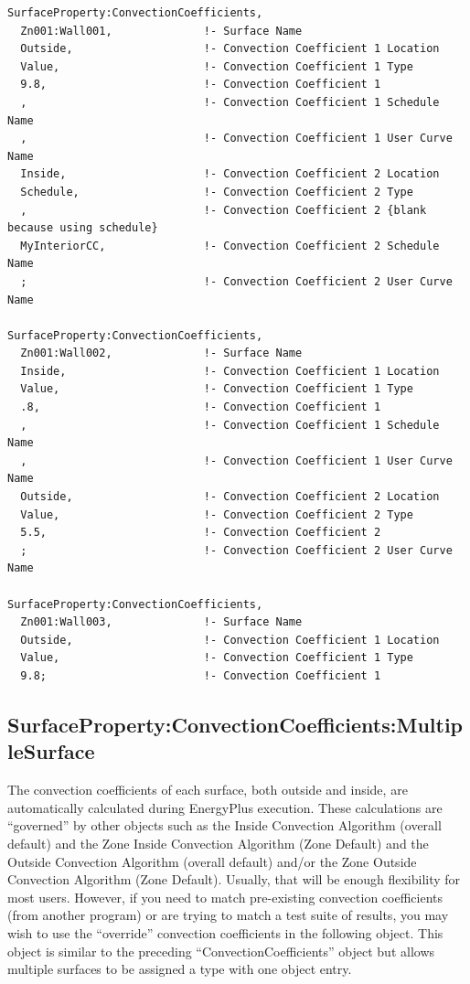 \begin{lstlisting}
SurfaceProperty:ConvectionCoefficients,
  Zn001:Wall001,              !- Surface Name
  Outside,                    !- Convection Coefficient 1 Location
  Value,                      !- Convection Coefficient 1 Type
  9.8,                        !- Convection Coefficient 1
  ,                           !- Convection Coefficient 1 Schedule Name
  ,                           !- Convection Coefficient 1 User Curve Name
  Inside,                     !- Convection Coefficient 2 Location
  Schedule,                   !- Convection Coefficient 2 Type
  ,                           !- Convection Coefficient 2 {blank because using schedule}
  MyInteriorCC,               !- Convection Coefficient 2 Schedule Name
  ;                           !- Convection Coefficient 2 User Curve Name

SurfaceProperty:ConvectionCoefficients,
  Zn001:Wall002,              !- Surface Name
  Inside,                     !- Convection Coefficient 1 Location
  Value,                      !- Convection Coefficient 1 Type
  .8,                         !- Convection Coefficient 1
  ,                           !- Convection Coefficient 1 Schedule Name
  ,                           !- Convection Coefficient 1 User Curve Name
  Outside,                    !- Convection Coefficient 2 Location
  Value,                      !- Convection Coefficient 2 Type
  5.5,                        !- Convection Coefficient 2
  ;                           !- Convection Coefficient 2 User Curve Name

SurfaceProperty:ConvectionCoefficients,
  Zn001:Wall003,              !- Surface Name
  Outside,                    !- Convection Coefficient 1 Location
  Value,                      !- Convection Coefficient 1 Type
  9.8;                        !- Convection Coefficient 1
\end{lstlisting}

\subsection{SurfaceProperty:ConvectionCoefficients:MultipleSurface}\label{surfacepropertyconvectioncoefficientsmultiplesurface}

The convection coefficients of each surface, both outside and inside, are automatically calculated during EnergyPlus execution. These calculations are ``governed'' by other objects such as the Inside Convection Algorithm (overall default) and the Zone Inside Convection Algorithm (Zone Default) and the Outside Convection Algorithm (overall default) and/or the Zone Outside Convection Algorithm (Zone Default). Usually, that will be enough flexibility for most users. However, if you need to match pre-existing convection coefficients (from another program) or are trying to match a test suite of results, you may wish to use the ``override'' convection coefficients in the following object. This object is similar to the preceding ``ConvectionCoefficients'' object but allows multiple surfaces to be assigned a type with one object entry.

